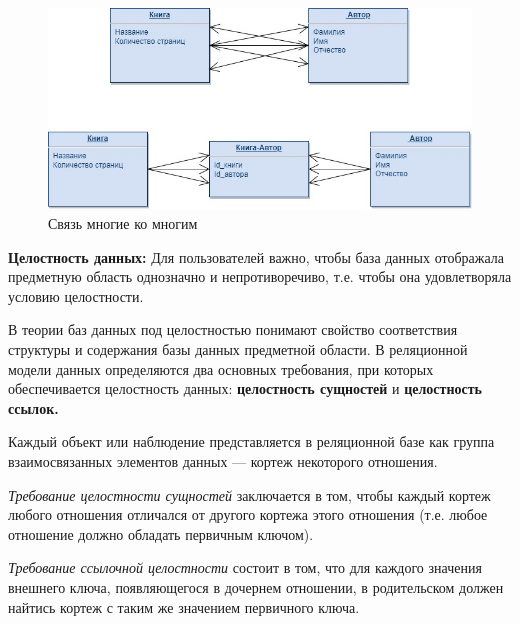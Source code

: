 \begin{figure}[!h]
    \centering
    \includegraphics[scale = 0.5]{1/nkn.jpg}
    \caption{Связь многие ко многим}
    \label{fig:nkn}
\end{figure}


\textbf{Целостность данных:} 
Для пользователей важно, чтобы база данных отображала предметную область однозначно и непротиворечиво, т.е. чтобы она удовлетворяла условию целостности.

В теории баз данных под целостностью понимают свойство соответствия структуры и содержания базы данных предметной области. В реляционной модели данных определяются два основных требования, при которых обеспечивается целостность данных: \textbf{целостность сущностей} и \textbf{целостность ссылок.}

Каждый объект или наблюдение представляется в реляционной базе как группа взаимосвязанных элементов данных — кортеж некоторого отношения.

\textit{Требование целостности сущностей} заключается в том, чтобы каждый кортеж любого отношения отличался от другого кортежа этого отношения (т.е. любое отношение должно обладать первичным ключом).

\textit{Требование ссылочной целостности} состоит в том, что для каждого значения внешнего ключа, появляющегося в дочернем отношении, в родительском должен найтись кортеж с таким же значением первичного ключа.
